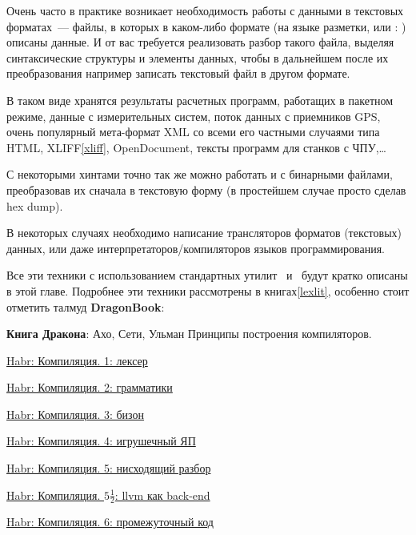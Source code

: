 \secdown

Очень часто в практике возникает необходимость работы с данными в текстовых
форматах\ ---  файлы, в которых в каком-либо
формате (на языке разметки, или : ) описаны данные. И от вас
требуется реализовать разбор такого файла, выделяя синтаксические структуры и
элементы данных, чтобы в дальнейшем после их преобразования например записать
текстовый файл в другом формате.

В таком виде хранятся результаты расчетных программ, работащих в пакетном
режиме, данные с измерительных систем, поток данных с приемников
GPS, очень популярный мета-формат XML со всеми его
частными случаями типа HTML, XLIFF\ref{xliff}, OpenDocument, тексты программ
для станков с ЧПУ,\ldots

С некоторыми хинтами точно так же можно работать и с бинарными файлами,
преобразовав их сначала в текстовую форму (в простейшем случае просто сделав hex
dump).

В некоторых случаях необходимо написание трансляторов форматов (текстовых)
данных, или даже интерпретаторов/компиляторов языков программирования.

\bigskip
Все эти техники с использованием стандартных утилит \ и \
будут кратко описаны в этой главе. Подробнее эти техники рассмотрены в
книгах\ref{lexlit}, особенно стоит отметить талмуд
\textbf{DragonBook}:

\bigskip

\label{exdragon}\cite{dragonbook} \textbf{Книга Дракона}: Ахо, Сети, Ульман
Принципы построения компиляторов.

\bigskip

\href{http://habrahabr.ru/post/99162/}{Habr: Компиляция. 1: лексер}

\href{http://habrahabr.ru/post/99298/}{Habr: Компиляция. 2: грамматики}

\href{http://habrahabr.ru/post/99366/}{Habr: Компиляция. 3: бизон}

\href{http://habrahabr.ru/post/99397/}{Habr: Компиляция. 4: игрушечный ЯП}

\href{http://habrahabr.ru/post/99466/}{Habr: Компиляция. 5: нисходящий разбор}

\href{http://habrahabr.ru/post/102597/}{Habr: Компиляция. $5\frac{1}{2}$: llvm
как back-end}

\href{http://habrahabr.ru/post/99592/}{Habr: Компиляция. 6: промежуточный код}

